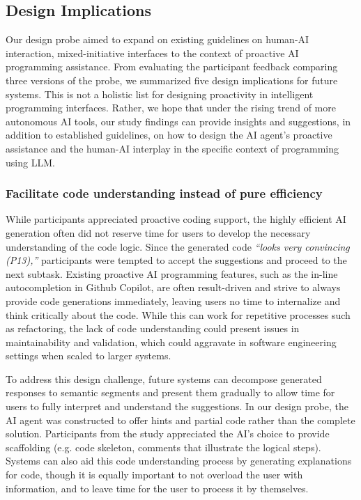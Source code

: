 \subsection{Design Implications}
\label{Discussion:design_implication}
Our design probe aimed to expand on existing guidelines on human-AI interaction, mixed-initiative interfaces \cite{amershi2019haiprinciple, horwitz1999mixedinitiative} to the context of proactive AI programming assistance.
From evaluating the participant feedback  comparing three versions of the \sys{} probe, we summarized five design implications for future systems.
This is not a holistic list for designing proactivity in intelligent programming interfaces.
Rather, we hope that under the rising trend of more autonomous AI tools, our study findings can provide insights and suggestions, in addition to established guidelines, on how to design the AI agent's proactive assistance and the human-AI interplay in the specific context of programming using  LLM.

\subsubsection{\textbf{Facilitate code understanding instead of pure efficiency}}
While participants appreciated proactive coding support, the highly efficient AI generation often did not reserve time for users to develop the necessary understanding of the code logic.
Since the generated code \textit{``looks very convincing (P13),''} participants were tempted to accept the suggestions and proceed to the next subtask.
Existing proactive AI programming features, such as the in-line autocompletion in Github Copilot, are often result-driven and strive to always provide code generations immediately, leaving users no time to internalize and think critically about the code.
While this can work for repetitive processes such as refactoring, the lack of code understanding could present issues in maintainability and validation, which could aggravate in software engineering settings when scaled to larger systems.

To address this design challenge, future systems can decompose generated responses to semantic segments and present them gradually to allow time for users to fully interpret and understand the suggestions.
In our design probe, the AI agent was constructed to offer hints and partial code rather than the complete solution.
Participants from the study appreciated the AI's choice to provide scaffolding (e.g. code skeleton, comments that illustrate the logical steps).
Systems can also aid this code understanding process by generating explanations for code, though it is equally important to not overload the user with information, and to leave time for the user to process it by themselves.

